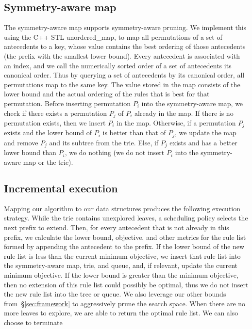 \subsection{Symmetry-aware map}
\label{sec:pmap}

The symmetry-aware map supports symmetry-aware pruning.
We implement this using the C++ STL unordered\_map, to map all permutations of a set of antecedents to a key, whose value
contains the best ordering of those antecedents (\ie the prefix with the smallest lower bound).
Every antecedent is associated with an index, and we call the numerically sorted order of a set of antecedents its canonical order.
Thus by querying a set of antecedents by its canonical order, all permutations map to the same key.
The value stored in the map consists of the lower bound and the actual ordering of the rules that is best for that permutation.
Before inserting permutation $P_i$ into the symmetry-aware map, we check if there exists a permutation $P_j$ of $P_i$ already in the map.
If there is no permutation exists, then we insert $P_i$ in the map.
Otherwise, if a permutation $P_j$ exists and the lower bound of $P_i$ is better than that of $P_j$, we update the map and remove $P_j$ and its subtree from the trie.
Else, if $P_j$ exists and has a better lower bound than $P_i$, we do nothing  (\ie we do not insert $P_i$ into the symmetry-aware map or the trie).

\subsection{Incremental execution}

Mapping our algorithm to our data structures produces the following execution strategy.
%
While the trie contains unexplored leaves, a scheduling policy selects the next prefix to extend.
%
Then, for every antecedent that is not already in this prefix, we calculate the lower bound,
objective, and other metrics for the rule list formed by appending the antecedent to the prefix.
%
If the lower bound of the new rule list is less than the current minimum objective, we insert that
rule list into the symmetry-aware map, trie, and queue, and, if relevant, update the
current minimum objective.
%
If the lower bound is greater than the minimum objective,
then no extension of this rule list could possibly be optimal,
thus we do not insert the new rule list into the tree or queue.
%
We also leverage our other bounds from~\S\ref{sec:framework}
to aggressively prune the search space.
%
When there are no more leaves to explore, we are able to return the optimal rule list.
%
We can also choose to terminate

